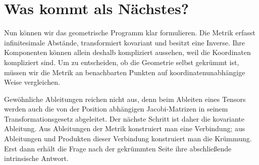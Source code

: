 \section{Was kommt als Nächstes?}

Nun können wir das geometrische Programm klar formulieren. Die Metrik erfasst infinitesimale Abstände, transformiert kovariant und besitzt eine Inverse. Ihre Komponenten können allein deshalb kompliziert aussehen, weil die Koordinaten kompliziert sind. Um zu entscheiden, ob die Geometrie selbst gekrümmt ist, müssen wir die Metrik an benachbarten Punkten auf koordinatenunabhängige Weise vergleichen.

Gewöhnliche Ableitungen reichen nicht aus, denn beim Ableiten eines Tensors werden auch die von der Position abhängigen Jacobi-Matrizen in seinem Transformationsgesetz abgeleitet. Der nächste Schritt ist daher die kovariante Ableitung. Aus Ableitungen der Metrik konstruiert man eine Verbindung; aus Ableitungen und Produkten dieser Verbindung konstruiert man die Krümmung. Erst dann erhält die Frage nach der gekrümmten Seite ihre abschließende intrinsische Antwort.